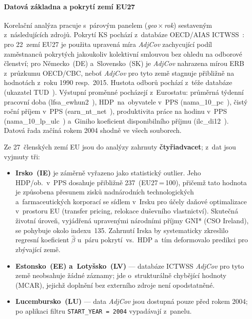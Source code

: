 
\paragraph{Datová základna a pokrytí zemí EU27}\label{par:korelace_data}

Korelační analýza pracuje s~párovým panelem (\textit{geo\,$\times$\,rok}) sestaveným z~následujících zdrojů.
Pokrytí \ac{KS} pochází z~databáze OECD/AIAS ICTWSS~\cite{oecd_aias_ictwss_CBC_ERB_pct}: pro 22~zemí EU27 je použita upravená míra \textit{AdjCov} zachycující podíl zaměstnanců pokrytých jakoukoliv kolektivní smlouvou bez ohledu na odborové členství; pro Německo~(DE) a~Slovensko~(SK) je \textit{AdjCov} nahrazena mírou ERB z~průzkumu OECD/CBC, neboť \textit{AdjCov} pro tyto země stagnuje přibližně na hodnotách z~roku 1990 resp.~2015.
Hustota odborů pochází z~téže databáze (ukazatel TUD~\cite{oecd_aias_ictwss_TUD_pct}).
Výstupní proměnné pocházejí z~Eurostatu: průměrná týdenní pracovní doba (lfsa\_ewhun2~\cite{eurostat_lfsa_ewhun2_HR_weekly}), HDP~na~obyvatele v~PPS (nama\_10\_pc~\cite{eurostat_nama_10_pc_PPS_EU27eq100}), čistý roční příjem v~PPS (earn\_nt\_net~\cite{eurostat_earn_nt_net_PPS_AW100}), produktivita práce na hodinu v~PPS (nama\_10\_lp\_ulc~\cite{eurostat_nama_10_lp_ulc_PPS_EU27eq100}) a~Giniho koeficient disponibilního příjmu (ilc\_di12~\cite{eurostat_ilc_di12_Gini}).
Datová řada začíná rokem 2004 shodně ve všech souborech.

Ze 27~členských zemí EU jsou do analýzy zahrnuty \textbf{čtyřiadvacet}; z~dat jsou vyjmuty tři:
\begin{itemize}
  \item \textbf{Irsko~(IE)} je záměrně vyřazeno jako statistický outlier.
    Jeho HDP/ob.~v~PPS dosahuje přibližně 237~(EU27\,=\,100), přičemž tato hodnota je způsobena přesunem zisků nadnárodních technologických a~farmaceutických korporací se sídlem v~Irsku pro účely daňové optimalizace v~prostoru EU (transfer pricing, relokace duševního vlastnictví).
    Skutečná životní úroveň, vyjádřená upravenými národními příjmy GNI* (CSO Ireland), se pohybuje okolo indexu~135.
    Zahrnutí Irska by systematicky zkreslilo regresní koeficient $\hat{\beta}$ u~páru pokrytí~vs.~HDP a~tím deformovalo predikci pro zbývající země.
  \item \textbf{Estonsko~(EE) a~Lotyšsko~(LV)} --- databáze ICTWSS \textit{AdjCov} pro tyto země neobsahuje žádné záznamy; jde o~strukturálně chybějící hodnoty (MCAR), jejichž doplnění bez externího zdroje není opodstatněné.
  \item \textbf{Lucembursko~(LU)} --- data \textit{AdjCov} jsou dostupná pouze před rokem 2004; po aplikaci filtru \texttt{START\_YEAR\,=\,2004} vypadávají z~panelu.
\end{itemize}

